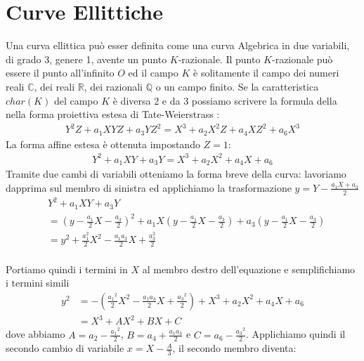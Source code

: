 \documentclass[a4paper,12pt]{tesiinfo}
\begin{document}
\chapter{Curve Ellittiche}
Una curva ellittica pu\`o esser definita come una curva Algebrica in due variabili, di grado 3, genere 1, avente un punto $K$-razionale. Il punto $K$-razionale pu\`o essere il punto all'infinito $O$ ed il campo $K$ \`e solitamente il campo dei numeri reali $\mathbb{C}$, dei reali $\mathbb{R}$, dei razionali $\mathbb{Q}$ o un campo finito. Se la caratteristica $char(K)$ del campo $K$ \`e diversa 2 e da 3 possiamo scrivere la formula della nella forma proiettiva estesa di Tate-Weierstrass :
\begin{gather}
Y^{2}Z + a_1XYZ + a_3YZ^2 =X^3 + a_2X^2Z + a_4XZ^2 + a_6X^3
\end{gather}
La forma affine estesa \`e ottenuta impostando $Z=1$: 
\begin{gather}
Y^{2} + a_1XY + a_3Y =X^3 + a_2X^2 + a_4X + a_6
\end{gather}
Tramite due cambi di variabili otteniamo la forma breve della curva: lavoriamo dapprima sul membro di sinistra ed applichiamo la trasformazione $y = Y - \frac{a_1X + a_3}{2}$
\begin{align*}
&Y^{2} + a_1XY + a_3Y  
\\ 
&= \left ( y - \frac{a_1}{2}X - \frac{a_3}{2} \right )^2 + a_1X \left ( y - \frac{a_1}{2}X - \frac{a_3}{2} \right ) + a_3 \left ( y - \frac{a_1}{2}X - \frac{a_3}{2} \right ) 
\\
&= y^2 + \frac{a_1^2}{2}X^2 - \frac{a_1a_3}{2}X +\frac{a_3^2}{2} 
\end{align*}
\\
Portiamo quindi i termini in $X$ al membro destro dell'equazione e semplifichiamo i termini simili
\begin{align*}
y^2 &= - \left ( \frac{{a_1}^2}{2}X^2 - \frac{a_1a_3}{2}X +\frac{{a_3}^2}{2} \right ) + X^3 + a_2X^2 + a_4X + a_6
\\
&= X^3 + AX^2 + BX + C 
\end{align*}
dove abbiamo $A = a_2 - \frac{{a_1}^2}{2}$, $B = a_4 + \frac{a_1a_3}{2}$ e $C = a_6 - \frac{{a_3}^2}{2}$.
Applichiamo quindi il secondo cambio di variabile $x = X - \frac{A}{3}$, il secondo membro diventa:
\end{document}
